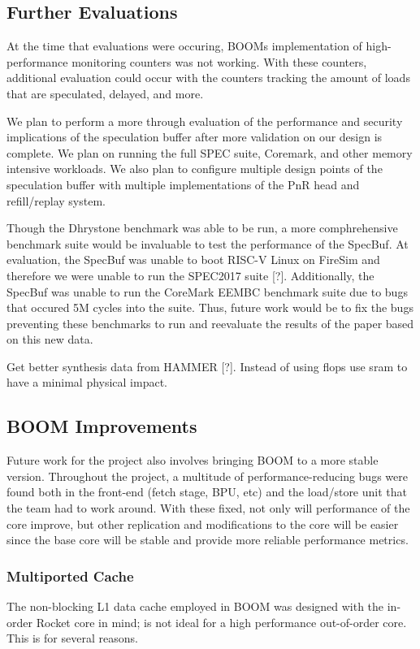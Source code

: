 \subsection{Further Evaluations}

At the time that evaluations were occuring, BOOMs implementation of high-performance monitoring counters was not working.
With these counters, additional evaluation could occur with the counters tracking the amount of 
loads that are speculated, delayed, and more.

We plan to perform a more through evaluation of the performance and security implications of the
speculation buffer after more validation on our design is complete. We plan on running the full
SPEC suite, Coremark, and other memory intensive workloads. We also plan to configure multiple design
points of the speculation buffer with multiple implementations of the PnR head and refill/replay system.

Though the Dhrystone benchmark was able to be run, a more comphrehensive benchmark suite would be invaluable to test
the performance of the SpecBuf. At evaluation, the SpecBuf was unable to boot RISC-V Linux on FireSim and therefore
we were unable to run the SPEC2017 suite [?]. Additionally, the SpecBuf was unable to run the CoreMark EEMBC benchmark
suite due to bugs that occured 5M cycles into the suite. Thus, future work would be to fix the bugs preventing these
benchmarks to run and reevaluate the results of the paper based on this new data.

Get better synthesis data from HAMMER [?]. Instead of using flops use sram to have a minimal 
physical impact.

\subsection{BOOM Improvements}

Future work for the project also involves bringing BOOM to a more stable version. Throughout
the project, a multitude of performance-reducing bugs were found both in the front-end (fetch stage, BPU, etc) and the 
load/store unit that the team had to work around. With these fixed, not only will performance
of the core improve, but other replication and modifications to the core will be easier since
the base core will be stable and provide more reliable performance metrics.

\subsubsection{Multiported Cache}
The non-blocking L1 data cache employed in BOOM was designed with the in-order Rocket core in mind; is not ideal for
a high performance out-of-order core. This is for several reasons.

